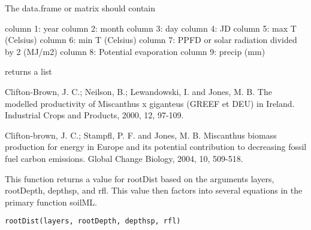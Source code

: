 \documentclass[letterpaper]{book}
\begin{document}
%
\begin{Details}\relax
The data.frame or matrix should contain

column 1: year column 2: month column 3: day column 4: JD
column 5: max T (Celsius) column 6: min T (Celsius) column
7: PPFD or solar radiation divided by 2 (MJ/m2) column 8:
Potential evaporation column 9: precip (mm)
\end{Details}
%
\begin{Value}
returns a list
\end{Value}
%
\begin{References}\relax
Clifton-Brown, J. C.; Neilson, B.; Lewandowski, I. and
Jones, M. B. The modelled productivity of Miscanthus x
giganteus (GREEF et DEU) in Ireland. Industrial Crops and
Products, 2000, 12, 97-109.

Clifton-brown, J. C.; Stampfl, P. F. and Jones, M. B.
Miscanthus biomass production for energy in Europe and its
potential contribution to decreasing fossil fuel carbon
emissions. Global Change Biology, 2004, 10, 509-518.
\end{References}
%
\begin{Examples}
\end{Examples}
%
\begin{Description}\relax
This function returns a value for rootDist based on the
arguments layers, rootDepth, depthsp, and rfl. This value
then factors into several equations in the primary function
soilML.
\end{Description}
%
\begin{Usage}
\begin{verbatim}
rootDist(layers, rootDepth, depthsp, rfl)
\end{verbatim}
\end{Usage}
\end{document}
